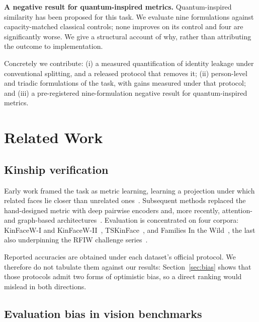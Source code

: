 \documentclass[journal,12pt]{IEEEtran}
\begin{document}
\textbf{A negative result for quantum-inspired metrics.} Quantum-inspired
similarity has been proposed for this task. We evaluate nine formulations
against capacity-matched classical controls; none improves on its control and
four are significantly worse. We give a structural account of why, rather than
attributing the outcome to implementation.

Concretely we contribute: (i) a measured quantification of identity leakage
under conventional splitting, and a released protocol that removes it;
(ii) person-level and triadic formulations of the task, with gains measured
under that protocol; and (iii) a pre-registered nine-formulation negative
result for quantum-inspired metrics.

\section{Related Work}


\subsection{Kinship verification}

Early work framed the task as metric learning, learning a projection under
which related faces lie closer than unrelated ones~\cite{lu2014neighborhood}.
Subsequent methods replaced the hand-designed metric with deep pairwise
encoders and, more recently, attention- and graph-based
architectures~\cite{TODO_recent_sota}. Evaluation is concentrated on four
corpora: KinFaceW-I and KinFaceW-II~\cite{lu2012kinfacew},
TSKinFace~\cite{qin2015tri}, and Families In the Wild~\cite{robinson2018fiw},
the last also underpinning the RFIW challenge series~\cite{robinson2020rfiw}.

Reported accuracies are obtained under each dataset's official protocol. We
therefore do not tabulate them against our results: Section~\ref{sec:bias}
shows that those protocols admit two forms of optimistic bias, so a direct
ranking would mislead in both directions.

\subsection{Evaluation bias in vision benchmarks}
\end{document}
